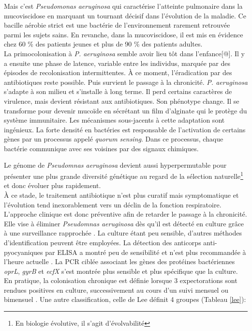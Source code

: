 \documentclass[12pt,a4paper]{article}
\begin{document}
Mais c’est \textit{Pseudomonas aeruginosa} qui caractérise l’atteinte pulmonaire dans la mucoviscidose en marquant un tournant décisif dans l’évolution de la maladie. Ce bacille aérobie strict est une bactérie de l'environnement rarement retrouvée parmi les sujets sains\cite{Plesiat}. En revanche, dans la mucoviscidose, il est mis en évidence\cite{LeBourgeois} chez 60 \% des patients jeunes et plus de 90 \% des patients adultes.\\
La primocolonisation à \textit{P. aeruginosa} semble avoir lieu tôt dans l’enfance[@]. Il y a ensuite une phase de latence, variable entre les individus, marquée par des épisodes de recolonisation intermittentes. À ce moment, l’éradication par des antibiotiques reste possible.
Puis survient le passage à la chronicité. \textit{P. aeruginosa} s'adapte à son milieu et s’installe à long terme. Il perd certains caractères de virulence, mais devient résistant aux antibiotiques\cite{LeBourgeois}. Son phénotype change. Il se transforme pour devenir mucoïde en sécrétant un film d’alginate qui le protège du système immunitaire. Les mécanismes sous-jacents à cette adaptation sont ingénieux. La forte densité en bactéries est responsable de l’activation de certains gènes par un processus appelé \textit{quorum sensing}\cite{Ruimy2004}. Dans ce processus, chaque bactérie communique avec ses voisines par des signaux chimiques.

Le génome de \textit{Pseudomnas aeruginosa} devient aussi hyperpermutable\cite{Davies} pour présenter une plus grande diversité génétique au regard de la sélection naturelle\footnote{En biologie évolutive, il s'agit d'évolvabilité} et donc évoluer plus rapidement. \\
À ce stade, le traitement antibiotique n’est plus curatif mais symptomatique et l'évolution tend inexorablement vers un déclin de la fonction respiratoire. \\
L'approche clinique est donc préventive afin de retarder le passage à la chronicité. Elle vise à éliminer \textit{Pseudomnas aeruginosa} dès qu'il est détecté en culture grâce à une surveillance rapprochée \cite{LeBourgeois}. La culture étant peu sensible, d’autres méthodes d'identification peuvent être employées. La détection des anticorps anti-pyocyaniques par ELISA a montré peu de sensibilité et n'est plus recommandée à l'heure actuelle \cite{Microbiologie2015}.
La PCR ciblée associant les gènes des protéines bactériennes \textit{oprL}, \textit{gyrB} et \textit{ecfX} s’est montrée plus sensible et plus spécifique que la culture\cite{LeGall}. \\
En pratique, la colonisation chronique est définie lorsque 3 expectorations sont rendues positives en culture, successivement au cours d’un suivi mensuel ou bimensuel \cite{LeBourgeois}.
Une autre classification, celle de Lee\cite{Lee2003} définit 4 groupes (Tableau \ref{lee}):
\end{document}
